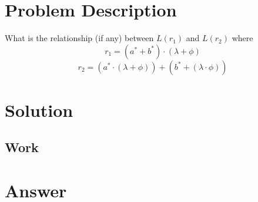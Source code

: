 \documentclass{assignment-x}
\begin{document}
\maketitle
\pagebreak

\section{Problem Description}
What is the relationship (if any) between $L(r_1)$ and $L(r_2)$ where
$$r_1 = (a^*+b^*)\cdot(\lambda + \phi)$$
$$r_2 = (a^* \cdot (\lambda + \phi))+ (b^* + (\lambda \cdot \phi))$$

\pagebreak

\section{Solution}


\subsection{Work}


\pagebreak

\section{Answer}
\end{document}
